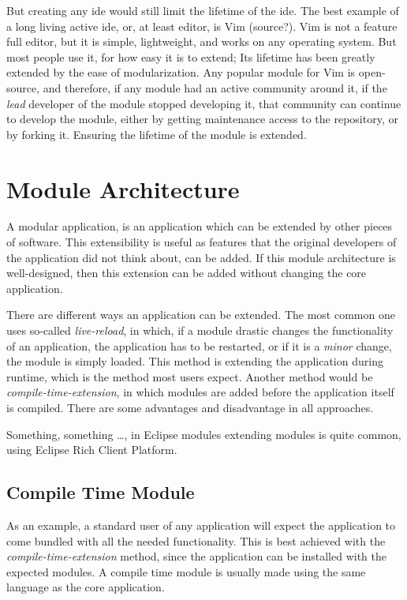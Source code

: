 But creating any \gls{ide} would still limit the lifetime of the \gls{ide}.
The best example of a long living active \gls{ide}, or, at least editor, is Vim
(source?). Vim is not a feature full editor, but it is simple, lightweight, and
works on any operating system. But most people use it, for how easy it is to
extend; Its lifetime has been greatly extended by the ease of modularization.
Any popular module for Vim is open-source, and therefore, if any module had an
active community around it, if the \textit{lead} developer of the module stopped
developing it, that community can continue to develop the module, either by
getting maintenance access to the repository, or by forking it. Ensuring the
lifetime of the module is extended.

\section{Module Architecture}


A modular application, is an application which can be extended by other pieces
of software. This extensibility is useful as features that the original
developers of the application did not think about, can be added. If this module
architecture is well-designed, then this extension can be added without changing
the core application.

There are different ways an application can be extended. The most common one
uses so-called \textit{live-reload}, in which, if a module drastic changes the
functionality of an application, the application has to be restarted, or if it
is a \textit{minor} change, the module is simply loaded. This method is
extending the application during runtime, which is the method most users
expect. Another method would be \textit{compile-time-extension}, in which
modules are added before the application itself is compiled. There are some
advantages and disadvantage in all approaches.

Something, something \dots, in Eclipse modules extending modules is quite
common, using Eclipse Rich Client Platform. \cite{eclipseRcp}

\subsection{Compile Time Module}

As an example, a standard user of any application will expect the application to
come bundled with all the needed functionality. This is best achieved with the
\textit{compile-time-extension} method, since the application can be installed
with the expected modules. A compile time module is usually made using the same
language as the core application.

